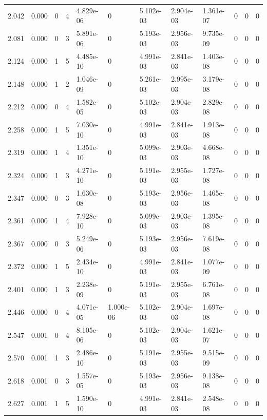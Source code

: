 \documentclass[preview]{standalone}
\begin{document}
{{{\begin{tabular}{L{1.2cm}C{1.2cm} C{0.3cm}C{0.5cm} C{1.4cm}C{1.4cm} C{1.4cm}C{1.4cm} C{1.6cm}C{1.6cm} C{1.6cm}C{1.6cm}}
  2.042  &  0.000  & 0     &  4 &  4.829e-06  & 0  &  5.102e-03&   2.904e-03& 1.361e-07 & 0   &  0 & 0  \\ 
  2.081  &  0.000  & 0     &  3 &  5.891e-06  & 0  &  5.193e-03&   2.956e-03& 9.735e-09 & 0   &  0 & 0  \\ 
  2.124  &  0.000  & 1     &  5 &  4.485e-10  & 0  &  4.991e-03&   2.841e-03& 1.403e-08 & 0   &  0 & 0  \\ 
  2.148  &  0.000  & 1     &  2 &  1.046e-09  & 0  &  5.261e-03&   2.995e-03& 3.179e-08 & 0   &  0 & 0  \\ 
  2.212  &  0.000  & 0     &  4 &  1.582e-05  & 0  &  5.102e-03&   2.904e-03& 2.829e-08 & 0   &  0 & 0  \\ 
  2.258  &  0.000  & 1     &  5 &  7.030e-10  & 0  &  4.991e-03&   2.841e-03& 1.913e-08 & 0   &  0 & 0  \\ 
  2.319  &  0.000  & 1     &  4 &  1.351e-10  & 0  &  5.099e-03&   2.903e-03& 4.668e-08 & 0   &  0 & 0  \\ 
  2.324  &  0.000  & 1     &  3 &  4.271e-10  & 0  &  5.191e-03&   2.955e-03& 1.727e-08 & 0   &  0 & 0  \\ 
  2.347  &  0.000  & 0     &  3 &  1.630e-08  & 0  &  5.193e-03&   2.956e-03& 1.465e-08 & 0   &  0 & 0  \\ 
  2.361  &  0.000  & 1     &  4 &  7.928e-10  & 0  &  5.099e-03&   2.903e-03& 1.395e-08 & 0   &  0 & 0  \\ 
  2.367  &  0.000  & 0     &  3 &  5.249e-06  & 0  &  5.193e-03&   2.956e-03& 7.619e-08 & 0   &  0 & 0  \\ 
  2.372  &  0.000  & 1     &  5 &  2.434e-10  & 0  &  4.991e-03&   2.841e-03& 1.077e-09 & 0   &  0 & 0  \\ 
  2.401  &  0.000  & 1     &  3 &  2.238e-09  & 0  &  5.191e-03&   2.955e-03& 6.761e-08 & 0   &  0 & 0  \\ 
  2.446  &  0.000  & 0     &  4 &  4.071e-05  & 1.000e-06  &  5.102e-03&   2.904e-03& 1.697e-08 & 0   &  0 & 0  \\ 
  2.547  &  0.001  & 0     &  4 &  8.105e-06  & 0  &  5.102e-03&   2.904e-03& 1.621e-07 & 0   &  0 & 0  \\ 
  2.570  &  0.001  & 1     &  3 &  2.486e-10  & 0  &  5.191e-03&   2.955e-03& 9.515e-09 & 0   &  0 & 0  \\ 
  2.618  &  0.001  & 0     &  3 &  1.557e-05  & 0  &  5.193e-03&   2.956e-03& 9.138e-08 & 0   &  0 & 0  \\ 
  2.627  &  0.001  & 1     &  5 &  1.590e-10  & 0  &  4.991e-03&   2.841e-03& 2.548e-08 & 0   &  0 & 0  \\ 

\end{tabular}}}}
\end{document}
